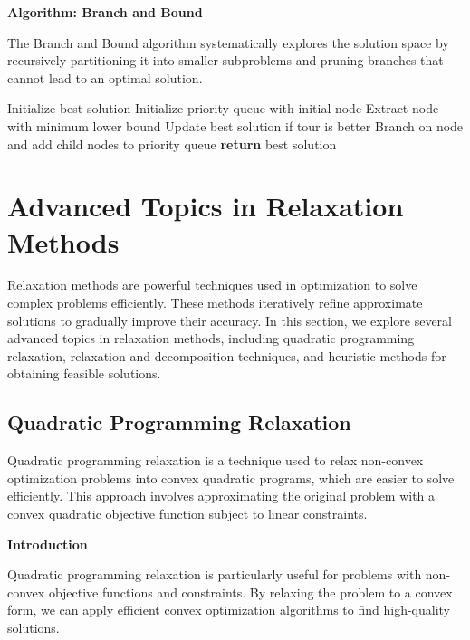 \documentclass[12pt]{book} %
\begin{document}
\textbf{Algorithm: Branch and Bound}

The Branch and Bound algorithm systematically explores the solution space by recursively partitioning it into smaller subproblems and pruning branches that cannot lead to an optimal solution.
\FloatBarrier
\begin{algorithm}[H]
\caption{Branch and Bound Algorithm for TSP}\label{alg:branch-bound}
\begin{algorithmic}[1]
    \State Initialize best solution
    \State Initialize priority queue with initial node
        \State Extract node with minimum lower bound
            \State Update best solution if tour is better
        \Else
            \State Branch on node and add child nodes to priority queue
        \EndIf
    \EndWhile
    \State \textbf{return} best solution
\EndProcedure
\end{algorithmic}
\end{algorithm}


\section{Advanced Topics in Relaxation Methods}

Relaxation methods are powerful techniques used in optimization to solve complex problems efficiently. These methods iteratively refine approximate solutions to gradually improve their accuracy. In this section, we explore several advanced topics in relaxation methods, including quadratic programming relaxation, relaxation and decomposition techniques, and heuristic methods for obtaining feasible solutions.

\subsection{Quadratic Programming Relaxation}

Quadratic programming relaxation is a technique used to relax non-convex optimization problems into convex quadratic programs, which are easier to solve efficiently. This approach involves approximating the original problem with a convex quadratic objective function subject to linear constraints.

\textbf{Introduction}

Quadratic programming relaxation is particularly useful for problems with non-convex objective functions and constraints. By relaxing the problem to a convex form, we can apply efficient convex optimization algorithms to find high-quality solutions.
\end{document}
